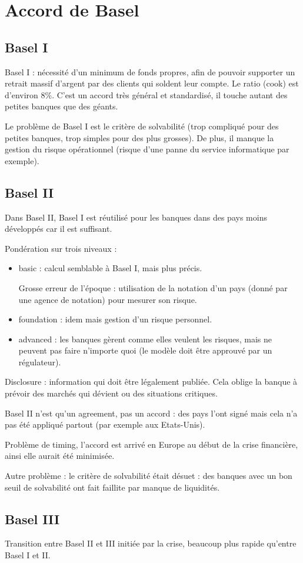
\section{Accord de Basel}

\subsection{Basel I}
Basel I : nécessité d'un minimum de fonds propres, afin de pouvoir supporter un retrait massif d'argent par des clients qui soldent leur compte. Le ratio (cook) est d'environ 8\%. C'est un accord très général et standardisé, il touche autant des petites banques que des géants.

Le problème de Basel I est le critère de solvabilité (trop compliqué pour des petites banques, trop simples pour des plus grosses). De plus, il manque la gestion du risque opérationnel (risque d'une panne du service informatique par exemple).

\subsection{Basel II}

Dans Basel II, Basel I est réutilisé pour les banques dans des pays moins développés car il est suffisant.

Pondération sur trois niveaux :

\begin{itemize}
	\item basic : calcul semblable à Basel I, mais plus précis.
	
	Grosse erreur de l'époque : utilisation de la notation d'un pays (donné par une agence de notation) pour mesurer son risque.
	
	\item foundation : idem mais gestion d'un risque personnel.
	\item advanced : les banques gèrent comme elles veulent les risques, mais ne peuvent pas faire n'importe quoi (le modèle doit être approuvé par un régulateur).
\end{itemize}

Disclosure : information qui doit être légalement publiée. Cela oblige la banque à prévoir des marchés qui dévient ou des situations critiques.

Basel II n'est qu'un agreement, pas un accord : des pays l'ont signé mais cela n'a pas été appliqué partout (par exemple aux Etats-Unis).

Problème de timing, l'accord est arrivé en Europe au début de la crise financière, ainsi elle aurait été minimisée.

Autre problème : le critère de solvabilité était désuet : des banques avec un bon seuil de solvabilité ont fait faillite par manque de liquidités.

\subsection{Basel III}

Transition entre Basel II et III initiée par la crise, beaucoup plus rapide qu'entre Basel I et II.

